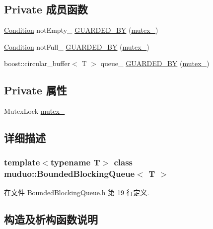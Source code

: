 \subsection*{Private 成员函数}
\begin{DoxyCompactItemize}
\item 
\hyperlink{classmuduo_1_1Condition}{Condition} not\+Empty\+\_\+ \hyperlink{classmuduo_1_1BoundedBlockingQueue_adc809585805fc6f065fa7414c29ab2af}{G\+U\+A\+R\+D\+E\+D\+\_\+\+BY} (\hyperlink{classmuduo_1_1BoundedBlockingQueue_a6e1bf1809a42f40f1a21178dc6620a6f}{mutex\+\_\+})
\item 
\hyperlink{classmuduo_1_1Condition}{Condition} not\+Full\+\_\+ \hyperlink{classmuduo_1_1BoundedBlockingQueue_aa1da415b15700639c638f90b2cd4850a}{G\+U\+A\+R\+D\+E\+D\+\_\+\+BY} (\hyperlink{classmuduo_1_1BoundedBlockingQueue_a6e1bf1809a42f40f1a21178dc6620a6f}{mutex\+\_\+})
\item 
boost\+::circular\+\_\+buffer$<$ T $>$ queue\+\_\+ \hyperlink{classmuduo_1_1BoundedBlockingQueue_ac0626cf28b612809461c2b6c818b2476}{G\+U\+A\+R\+D\+E\+D\+\_\+\+BY} (\hyperlink{classmuduo_1_1BoundedBlockingQueue_a6e1bf1809a42f40f1a21178dc6620a6f}{mutex\+\_\+})
\end{DoxyCompactItemize}
\subsection*{Private 属性}
\begin{DoxyCompactItemize}
\item 
Mutex\+Lock \hyperlink{classmuduo_1_1BoundedBlockingQueue_a6e1bf1809a42f40f1a21178dc6620a6f}{mutex\+\_\+}
\end{DoxyCompactItemize}


\subsection{详细描述}
\subsubsection*{template$<$typename T$>$\newline
class muduo\+::\+Bounded\+Blocking\+Queue$<$ T $>$}



在文件 Bounded\+Blocking\+Queue.\+h 第 19 行定义.



\subsection{构造及析构函数说明}
\mbox{\label{classmuduo_1_1BoundedBlockingQueue_a2fe33813e688d6e4afd6c3505e70fcbb}} 
